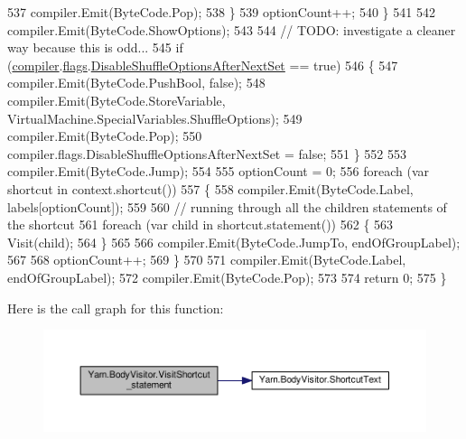 \begin{DoxyCode}
537                     compiler.Emit(ByteCode.Pop);
538                 \}
539                 optionCount++;
540             \}
541 
542             compiler.Emit(ByteCode.ShowOptions);
543 
544             \textcolor{comment}{// TODO: investigate a cleaner way because this is odd...}
545             \textcolor{keywordflow}{if} (\hyperlink{a00046_a39d71c6de5e1c9f7d2f78ac2ccd5743d}{compiler}.\hyperlink{a00040_aeba873449ff9fb1c6d731ff7eb25f0a0}{flags}.\hyperlink{a00040_ae27568d71aa82edfd7841d425969a4fb}{DisableShuffleOptionsAfterNextSet}
       == \textcolor{keyword}{true})
546             \{
547                 compiler.Emit(ByteCode.PushBool, \textcolor{keyword}{false});
548                 compiler.Emit(ByteCode.StoreVariable, VirtualMachine.SpecialVariables.ShuffleOptions);
549                 compiler.Emit(ByteCode.Pop);
550                 compiler.flags.DisableShuffleOptionsAfterNextSet = \textcolor{keyword}{false};
551             \}
552 
553             compiler.Emit(ByteCode.Jump);
554 
555             optionCount = 0;
556             \textcolor{keywordflow}{foreach} (var shortcut \textcolor{keywordflow}{in} context.shortcut())
557             \{
558                 compiler.Emit(ByteCode.Label, labels[optionCount]);
559 
560                 \textcolor{comment}{// running through all the children statements of the shortcut}
561                 \textcolor{keywordflow}{foreach} (var child \textcolor{keywordflow}{in} shortcut.statement())
562                 \{
563                     Visit(child);
564                 \}
565 
566                 compiler.Emit(ByteCode.JumpTo, endOfGroupLabel);
567 
568                 optionCount++;
569             \}
570 
571             compiler.Emit(ByteCode.Label, endOfGroupLabel);
572             compiler.Emit(ByteCode.Pop);
573 
574             \textcolor{keywordflow}{return} 0;
575         \}
\end{DoxyCode}


Here is the call graph for this function\-:
\nopagebreak
\begin{figure}[H]
\begin{center}
\leavevmode
\includegraphics[width=350pt]{a00046_ad1576a22d74304c3155a0c2fa91be5b9_cgraph}
\end{center}
\end{figure}


